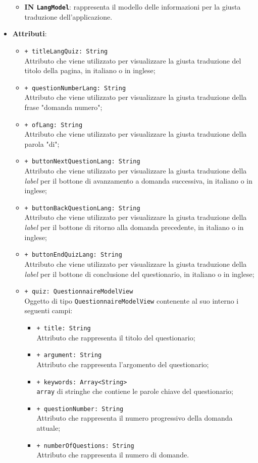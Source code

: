 \begin{itemize}
\begin{itemize}
		\item \textbf{IN \texttt{LangModel}}: rappresenta il modello delle informazioni per la giusta traduzione dell'applicazione.
	\end{itemize}
		\item \textbf{Attributi}:
		\begin{itemize}
			\item \texttt{+ titleLangQuiz: String} \\ Attributo che viene utilizzato per visualizzare la giusta traduzione del titolo della pagina, in italiano o in inglese;
			\item \texttt{+ questionNumberLang: String} \\ Attributo che viene utilizzato per visualizzare la giusta traduzione della frase "domanda numero";
			\item \texttt{+ ofLang: String} \\ Attributo che viene utilizzato per visualizzare la giusta traduzione della parola "di";
			\item \texttt{+ buttonNextQuestionLang: String} \\ Attributo che viene utilizzato per visualizzare la giusta traduzione della \textit{label} per il bottone di avanzamento a domanda successiva, in italiano o in inglese;
			\item \texttt{+ buttonBackQuestionLang: String} \\ Attributo che viene utilizzato per visualizzare la giusta traduzione della \textit{label} per il bottone di ritorno alla domanda precedente, in italiano o in inglese;
			\item \texttt{+ buttonEndQuizLang: String} \\ Attributo che viene utilizzato per visualizzare la giusta traduzione della \textit{label} per il bottone di conclusione del questionario, in italiano o in inglese;
			\item \texttt{+ quiz: QuestionnaireModelView} \\ Oggetto di tipo \texttt{QuestionnaireModelView} contenente al suo interno i seguenti campi:
			\begin{itemize}
				\item \texttt{+ title: String} \\ Attributo che rappresenta il titolo del questionario;
				\item \texttt{+ argument: String} \\ Attributo che rappresenta l'argomento del questionario;
				\item \texttt{+ keywords: Array<String>} \\ \texttt{array} di stringhe che contiene le parole chiave del questionario;
				\item \texttt{+ questionNumber: String} \\ Attributo che rappresenta il numero progressivo della domanda attuale;
				\item \texttt{+ numberOfQuestions: String} \\ Attributo che rappresenta il numero di domande.
			\end{itemize}
		\end{itemize}
\end{itemize}